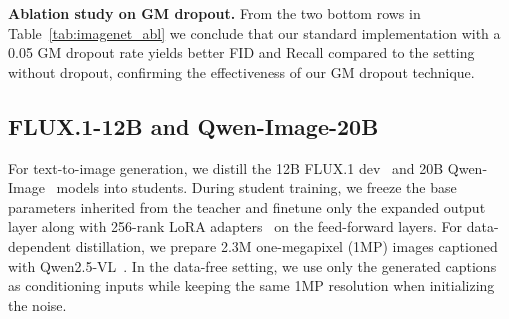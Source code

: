 \textbf{Ablation study on GM dropout.}
From the two bottom rows in Table~\ref{tab:imagenet_abl} we conclude that our standard implementation with a 0.05 GM dropout rate yields better FID and Recall compared to the setting without dropout, confirming the effectiveness of our GM dropout technique. 


\subsection{FLUX.1-12B and Qwen-Image-20B}
\label{sec:flux_qwen}

For text-to-image generation, we distill the 12B FLUX.1 dev~\citep{flux2024} and 20B Qwen-Image~\citep{qwen} models into \methodname{} students. During student training, we freeze the base parameters inherited from the teacher and finetune only the expanded output layer along with 256-rank LoRA adapters~\citep{hu2022lora} on the feed-forward layers. For data-dependent distillation, we prepare 2.3M one-megapixel (1MP) images captioned with Qwen2.5-VL~\citep{bai2025qwen25vltechnicalreport}. In the data-free setting, we use only the generated captions as conditioning 
inputs while keeping the same 1MP resolution when initializing the noise.

